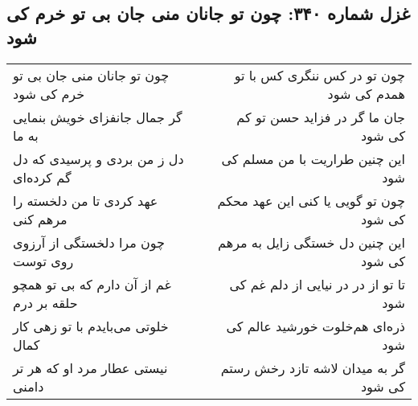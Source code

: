 \begin{center}
\section*{غزل شماره ۳۴۰: چون تو جانان منی جان بی تو خرم کی شود}
\label{sec:340}
\begin{longtable}{l p{0.5cm} r}
چون تو جانان منی جان بی تو خرم کی شود
&&
چون تو در کس ننگری کس با تو همدم کی شود
\\
گر جمال جانفزای خویش بنمایی به ما
&&
جان ما گر در فزاید حسن تو کم کی شود
\\
دل ز من بردی و پرسیدی که دل گم کرده‌ای
&&
این چنین طراریت با من مسلم کی شود
\\
عهد کردی تا من دلخسته را مرهم کنی
&&
چون تو گویی یا کنی این عهد محکم کی شود
\\
چون مرا دلخستگی از آرزوی روی توست
&&
این چنین دل خستگی زایل به مرهم کی شود
\\
غم از آن دارم که بی تو همچو حلقه بر درم
&&
تا تو از در در نیایی از دلم غم کی شود
\\
خلوتی می‌بایدم با تو زهی کار کمال
&&
ذره‌ای هم‌خلوت خورشید عالم کی شود
\\
نیستی عطار مرد او که هر تر دامنی
&&
گر به میدان لاشه تازد رخش رستم کی شود
\\
\end{longtable}
\end{center}
